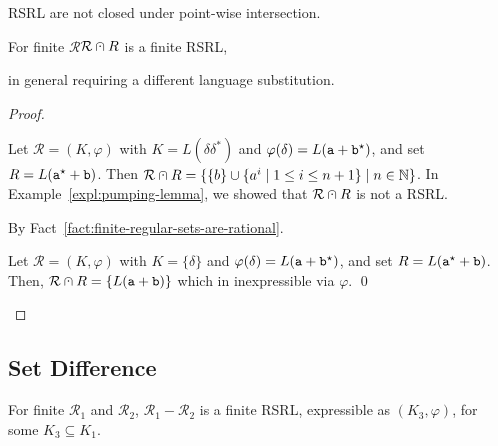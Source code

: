 \documentclass[envcountsame]{llncs}
\newcommand{\rationalset}{\ensuremath{\mathcal{R}}\xspace}
\newcommand{\bN}{\ensuremath{\mathbb{N}}\xspace}
\newcommand{\dotcap}{\:\ensuremath{\mathaccent\cdot\cap}\:}
\newcommand{\RegularlyGeneratedLanguageSetAbbrev}{RSRL\xspace}
\newcommand{\RegularlyGeneratedLanguageSetsStartAbbrev}{RSRL\xspace}
\begin{document}
\begin{proposition}
  \label{prop:closure:pw-intersection}
  \begin{inparaenum}
  \item\label{prop:closure:pw-intersection:a} \RegularlyGeneratedLanguageSetsStartAbbrev are not
    closed under point-wise intersection.
  \item\label{prop:closure:pw-intersection:b} For finite
    \rationalset $\rationalset \dotcap R$ is a finite \RegularlyGeneratedLanguageSetAbbrev,
  \item\label{prop:closure:pw-intersection:c} in general requiring a
    different language substitution.
  \end{inparaenum}
\end{proposition}

\begin{proof}
  \begin{inparaenum}[\bfseries(1)]
  \item Let $\rationalset = (K, \varphi)$ with $K = L(\delta\delta^*)$
    and $\varphi(\delta) = L({\tt a + b^\star})$, and set $R = L({\tt
      a^\star + b})$.  
Then $\rationalset \dotcap R = \{ \{ b \} \cup \{ a^{i} \mid 1
    \leq i \leq n + 1 \} \mid n \in \bN \}$.  
In Example~\ref{expl:pumping-lemma}, we showed that
    $\rationalset\dotcap R$ is not a \RegularlyGeneratedLanguageSetAbbrev.
  \item By Fact~\ref{fact:finite-regular-sets-are-rational}.
  \item Let $\rationalset = (K, \varphi)$ with $K = \{ \delta \}$ and
    $\varphi(\delta) = L({\tt a + b^\star})$, and set $R =
    L({\tt a^\star + b})$.
Then, $\rationalset \dotcap R = \{ L({\tt a + b }) \}$ which in
    inexpressible via $\varphi$.  \qed
  \end{inparaenum}
\end{proof}








\subsection{Set Difference}
\label{sec:set-difference}




\begin{proposition}
  \label{prop:closure:difference}
For finite $\rationalset_1$
    and $\rationalset_2$, $\rationalset_1 - \rationalset_2$ is a
    finite \RegularlyGeneratedLanguageSetAbbrev, expressible as $(K_3, \varphi)$, for some
    $K_3 \subseteq K_1$.
\end{proposition}
\end{document}

